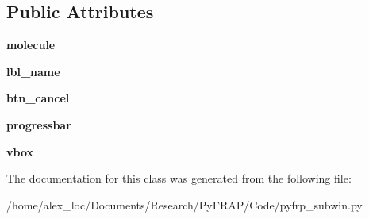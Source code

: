 \subsection*{Public Attributes}
\begin{DoxyCompactItemize}
\item 
\hypertarget{classpyfrp__subwin_1_1analyze__all__prog_a4c80819f1c4529c4db6ce364898b994a}{{\bfseries molecule}}\label{classpyfrp__subwin_1_1analyze__all__prog_a4c80819f1c4529c4db6ce364898b994a}

\item 
\hypertarget{classpyfrp__subwin_1_1analyze__all__prog_ae3f9193bfd66680782123fcccdb8c0b9}{{\bfseries lbl\+\_\+name}}\label{classpyfrp__subwin_1_1analyze__all__prog_ae3f9193bfd66680782123fcccdb8c0b9}

\item 
\hypertarget{classpyfrp__subwin_1_1analyze__all__prog_a334f4d57ba7d2522b125af9a7ef5765e}{{\bfseries btn\+\_\+cancel}}\label{classpyfrp__subwin_1_1analyze__all__prog_a334f4d57ba7d2522b125af9a7ef5765e}

\item 
\hypertarget{classpyfrp__subwin_1_1analyze__all__prog_ad441a8233cea8bb781306773d1277432}{{\bfseries progressbar}}\label{classpyfrp__subwin_1_1analyze__all__prog_ad441a8233cea8bb781306773d1277432}

\item 
\hypertarget{classpyfrp__subwin_1_1analyze__all__prog_a8b666a1cb3a06958b4b18a2fb3673727}{{\bfseries vbox}}\label{classpyfrp__subwin_1_1analyze__all__prog_a8b666a1cb3a06958b4b18a2fb3673727}

\end{DoxyCompactItemize}


The documentation for this class was generated from the following file\+:\begin{DoxyCompactItemize}
\item 
/home/alex\+\_\+loc/\+Documents/\+Research/\+Py\+F\+R\+A\+P/\+Code/pyfrp\+\_\+subwin.\+py\end{DoxyCompactItemize}
